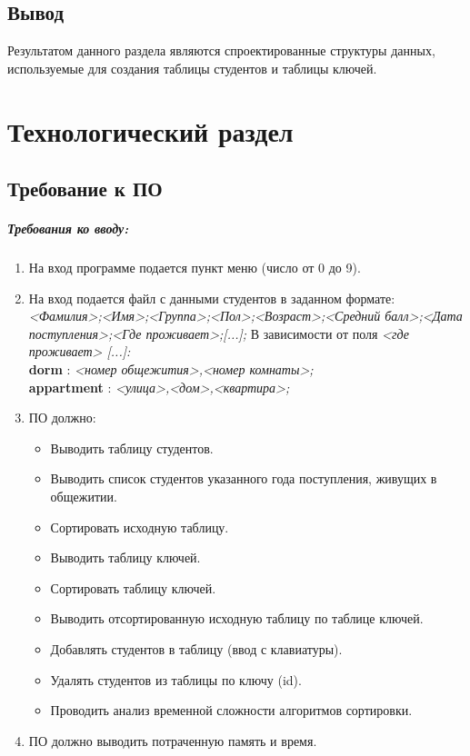 \section{Вывод}

Результатом данного раздела являются спроектированные структуры данных, используемые для создания таблицы студентов и таблицы ключей.

\chapter{Технологический раздел}

\section{Требование к ПО}

\paragraph{Требования ко вводу: }

\begin{enumerate}
	\item На вход программе подается пункт меню (число от 0 до 9).
	\item На вход подается файл с данными студентов в заданном формате: \\
	\textit{<Фамилия>;<Имя>;<Группа>;<Пол>;<Возраст>;<Средний балл>;<Дата поступления>;<Где проживает>;[...];} В зависимости от поля \textit{<где проживает> [...]:} \\
	\textbf{dorm} : \textit{<номер общежития>,<номер комнаты>;} \\
	\textbf{appartment} : \textit{<улица>,<дом>,<квартира>;}
	\item ПО должно:
	\begin{itemize}
		\item Выводить таблицу студентов.
		\item Выводить список студентов указанного года поступления, живущих в общежитии.
		\item Сортировать исходную таблицу.
		\item Выводить таблицу ключей.
		\item Сортировать таблицу ключей.
		\item Выводить отсортированную исходную таблицу по таблице ключей.
		\item Добавлять студентов в таблицу (ввод с клавиатуры).
		\item Удалять студентов из таблицы по ключу (id).
		\item Проводить анализ временной сложности алгоритмов сортировки.
	\end{itemize}
	\item ПО должно выводить потраченную память и время.
\end{enumerate}

